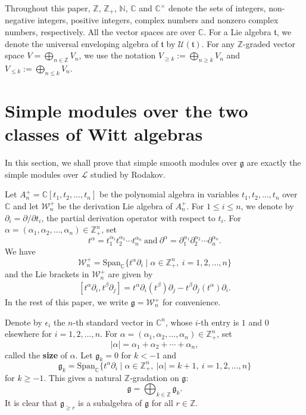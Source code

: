 \documentclass[12pt, a4paper]{amsart}
\newcommand{\fg}{\mathfrak g}
\newcommand{\C}{\mathbb{C}}
\newcommand{\N}{\mathbb N}
\newcommand{\Z}{\mathbb Z}
\def\W{\mathcal{W}}
\theoremstyle{Theorem}
\theoremstyle{Theorem}
\numberwithin{equation}{section}
\begin{document}
Throughout this paper, $\Z$, $\Z_{+}$, $\N$, $\C$ and $\C^{\times}$
denote the sets of integers, non-negative integers, positive integers,
complex numbers and nonzero complex numbers, respectively. All the vector spaces are over $\C$. For a Lie algebra $\mathfrak{t}$,
we denote the   universal enveloping algebra of $\mathfrak{t}$ by $\mathcal{U}(\mathfrak{t})$.
For any $\Z$-graded vector space $V=\bigoplus_{n\in\Z}V_{n}$,
we use the notation $V_{\geq k}:=\bigoplus_{n\geq k}V_{n}$ and $V_{\leq k}:=\bigoplus_{n\leq k}V_{n}$.


\section{Simple modules over the two classes of Witt algebras}

In this section, we shall   prove that simple smooth modules over $\mathfrak{g}$ are exactly the simple modules over $\mathcal{L}$ studied by Rodakov.


Let $A_{n}^{+}=\C[t_{1},t_{2},\dots,t_{n}]$ be the polynomial algebra in variables $t_1,t_2,\dots,t_n$  over $\C$ and let $\W_{n}^{+}$ be the derivation Lie algebra of $A_n^+$.
For $1\leq i\le n$, we denote by $\partial_i=\partial/\partial t_i$,
the partial derivation operator with respect to $t_i$.
For $\alpha=(\alpha_1,\alpha_2,\dots,\alpha_n)\in\Z_+^n$, set
\[t^\alpha=t_1^{\alpha_1}t_2^{\alpha_2}\cdots t_n^{\alpha_n}\ \text{and}\
\partial^\alpha=\partial_1^{\alpha_1}\partial_2^{\alpha_2}\cdots \partial_n^{\alpha_n}  .\]
We have
\[\W_{n}^{+}=\text{Span}_{\C}\{t^\alpha\partial_i\mid \alpha\in\Z_{+}^n,\ i=1,2,\dots,n\}\]
and the Lie brackets in $\W_{n}^{+}$ are given by
\begin{align}\label{lie-bracket}
	[t^{\alpha}\partial_{i},t^{\beta}\partial_{j}]=t^{\alpha}\partial_{i}(t^{\beta})
	\partial_{j}-t^{\beta}\partial_{j}(t^{\alpha})\partial_{i}.
\end{align}
In the rest of this paper, we write $\fg=\W_n^+$ for convenience.

Denote by $\epsilon_{i}$ the $n$-th standard vector in $\C^n$, whose $i$-th entry is $1$ and $0$ elsewhere for $i=1,2,\dots,n$.
For $\alpha=(\alpha_1,\alpha_2,\dots,\alpha_n)\in\Z^n_+$, set
\[|\alpha|=\alpha_1+\alpha_2+\cdots+\alpha_n,\]
called the {\bf  size} of $\alpha$. Let $\fg_{k}=0$ for $k<-1$ and
\[\fg_k=\text{Span}_{\C}\{t^{\alpha}\partial_{i}\mid \alpha\in\Z_{+}^n,\ |\alpha|=k+1,\ i=1,2,\dots,n\}\]
for $k\geq-1$. This gives a natural $\Z$-gradation on $\fg$:
\[\fg=\bigoplus_{k\in\Z}\fg_k.\]
It is clear that $\fg_{\geq r}$ is a subalgebra of $\fg$ for all $r\in\Z$.
\end{document}

